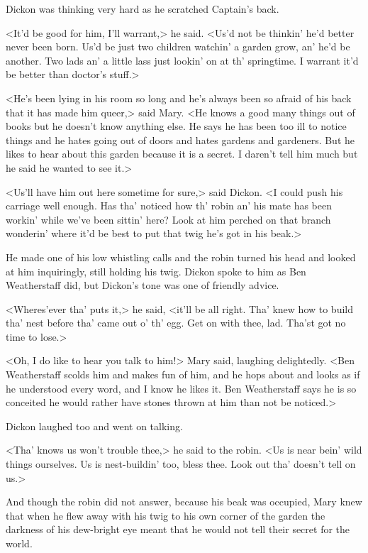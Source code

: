 Dickon was thinking very hard as he scratched Captain's back.

<It'd be good for him, I'll warrant,> he said. <Us'd not be thinkin' he'd better never been born. Us'd be just two children watchin' a garden grow, an' he'd be another. Two lads an' a little lass just lookin' on at th' springtime. I warrant it'd be better than doctor's stuff.>

<He's been lying in his room so long and he's always been so afraid of his back that it has made him queer,> said Mary. <He knows a good many things out of books but he doesn't know anything else. He says he has been too ill to notice things and he hates going out of doors and hates gardens and gardeners. But he likes to hear about this garden because it is a secret. I daren't tell him much but he said he wanted to see it.>

<Us'll have him out here sometime for sure,> said Dickon. <I could push his carriage well enough. Has tha' noticed how th' robin an' his mate has been workin' while we've been sittin' here? Look at him perched on that branch wonderin' where it'd be best to put that twig he's got in his beak.>

He made one of his low whistling calls and the robin turned his head and looked at him inquiringly, still holding his twig. Dickon spoke to him as Ben Weatherstaff did, but Dickon's tone was one of friendly advice.

<Wheres'ever tha' puts it,> he said, <it'll be all right. Tha' knew how to build tha' nest before tha' came out o' th' egg. Get on with thee, lad. Tha'st got no time to lose.>

<Oh, I do like to hear you talk to him!> Mary said, laughing delightedly. <Ben Weatherstaff scolds him and makes fun of him, and he hops about and looks as if he understood every word, and I know he likes it. Ben Weatherstaff says he is so conceited he would rather have stones thrown at him than not be noticed.>

Dickon laughed too and went on talking.

<Tha' knows us won't trouble thee,> he said to the robin. <Us is near bein' wild things ourselves. Us is nest-buildin' too, bless thee. Look out tha' doesn't tell on us.>

And though the robin did not answer, because his beak was occupied, Mary knew that when he flew away with his twig to his own corner of the garden the darkness of his dew-bright eye meant that he would not tell their secret for the world.